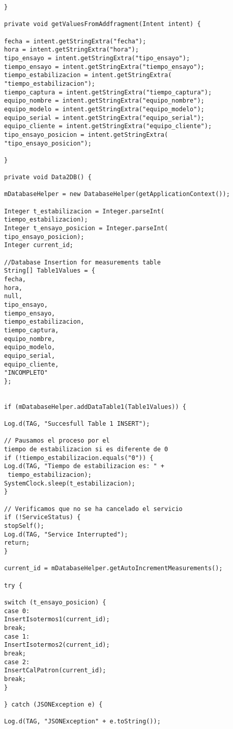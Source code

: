 \begin{lstlisting}
}

private void getValuesFromAddfragment(Intent intent) {

fecha = intent.getStringExtra("fecha");
hora = intent.getStringExtra("hora");
tipo_ensayo = intent.getStringExtra("tipo_ensayo");
tiempo_ensayo = intent.getStringExtra("tiempo_ensayo");
tiempo_estabilizacion = intent.getStringExtra(
"tiempo_estabilizacion");
tiempo_captura = intent.getStringExtra("tiempo_captura");
equipo_nombre = intent.getStringExtra("equipo_nombre");
equipo_modelo = intent.getStringExtra("equipo_modelo");
equipo_serial = intent.getStringExtra("equipo_serial");
equipo_cliente = intent.getStringExtra("equipo_cliente");
tipo_ensayo_posicion = intent.getStringExtra(
"tipo_ensayo_posicion");

}

private void Data2DB() {

mDatabaseHelper = new DatabaseHelper(getApplicationContext());

Integer t_estabilizacion = Integer.parseInt(
tiempo_estabilizacion);
Integer t_ensayo_posicion = Integer.parseInt(
tipo_ensayo_posicion);
Integer current_id;

//Database Insertion for measurements table
String[] Table1Values = {
fecha,
hora,
null,
tipo_ensayo,
tiempo_ensayo,
tiempo_estabilizacion,
tiempo_captura,
equipo_nombre,
equipo_modelo,
equipo_serial,
equipo_cliente,
"INCOMPLETO"
};


if (mDatabaseHelper.addDataTable1(Table1Values)) {

Log.d(TAG, "Succesfull Table 1 INSERT");

// Pausamos el proceso por el 
tiempo de estabilizacion si es diferente de 0
if (!tiempo_estabilizacion.equals("0")) {
Log.d(TAG, "Tiempo de estabilizacion es: " +
 tiempo_estabilizacion);
SystemClock.sleep(t_estabilizacion);
}

// Verificamos que no se ha cancelado el servicio
if (!ServiceStatus) {
stopSelf();
Log.d(TAG, "Service Interrupted");
return;
}

current_id = mDatabaseHelper.getAutoIncrementMeasurements();

try {

switch (t_ensayo_posicion) {
case 0:
InsertIsotermos1(current_id);
break;
case 1:
InsertIsotermos2(current_id);
break;
case 2:
InsertCalPatron(current_id);
break;
}

} catch (JSONException e) {

Log.d(TAG, "JSONException" + e.toString());


\end{lstlisting}
